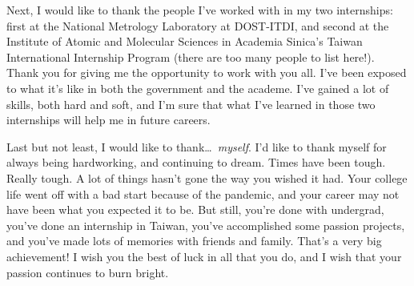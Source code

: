 Next, I would like to thank the people I've worked with in my two internships:
	first at the National Metrology Laboratory at DOST-ITDI, 
	and
	second at the Institute of Atomic and Molecular Sciences in Academia Sinica's Taiwan International Internship Program
	(there are too many people to list here!).
Thank you for giving me the opportunity to work with you all.
I've been exposed to what it's like in both the government and the academe. I've gained a lot of skills, both hard and soft, and I'm sure that what I've learned in those two internships will help me in future careers.

Last but not least, I would like to thank\ldots\ \textit{myself}.
I'd like to thank myself for always being hardworking, and continuing to dream.
Times have been tough.
Really tough.
A lot of things hasn't gone the way you wished it had.
Your college life went off with a bad start because of the pandemic,
and your career may not have been what you expected it to be.
But still, you're done with undergrad, you've done an internship in Taiwan, you've accomplished some passion projects, and you've made lots of memories with friends and family. That's a very big achievement!
I wish you the best of luck in all that you do,
and I wish that your passion continues to burn bright.